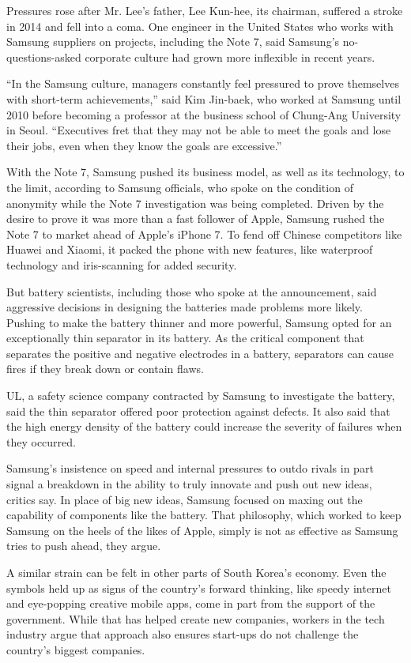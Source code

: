 Pressures rose after Mr. Lee's father, Lee Kun-hee, its chairman,
suffered a stroke in 2014 and fell into a coma. One engineer in the
United States who works with Samsung suppliers on projects, including
the Note 7, said Samsung's no-questions-asked corporate culture had
grown more inflexible in recent years.

``In the Samsung culture, managers constantly feel pressured to prove
themselves with short-term achievements,'' said Kim Jin-baek, who worked
at Samsung until 2010 before becoming a professor at the business school
of Chung-Ang University in Seoul. ``Executives fret that they may not be
able to meet the goals and lose their jobs, even when they know the
goals are excessive.''

With the Note 7, Samsung pushed its business model, as well as its
technology, to the limit, according to Samsung officials, who spoke on
the condition of anonymity while the Note 7 investigation was being
completed. Driven by the desire to prove it was more than a fast
follower of Apple, Samsung rushed the Note 7 to market ahead of Apple's
iPhone 7. To fend off Chinese competitors like Huawei and Xiaomi, it
packed the phone with new features, like waterproof technology and
iris-scanning for added security.

But battery scientists, including those who spoke at the announcement,
said aggressive decisions in designing the batteries made problems more
likely. Pushing to make the battery thinner and more powerful, Samsung
opted for an exceptionally thin separator in its battery. As the
critical component that separates the positive and negative electrodes
in a battery, separators can cause fires if they break down or contain
flaws.

UL, a safety science company contracted by Samsung to investigate the
battery, said the thin separator offered poor protection against
defects. It also said that the high energy density of the battery could
increase the severity of failures when they occurred.

Samsung's insistence on speed and internal pressures to outdo rivals in
part signal a breakdown in the ability to truly innovate and push out
new ideas, critics say. In place of big new ideas, Samsung focused on
maxing out the capability of components like the battery. That
philosophy, which worked to keep Samsung on the heels of the likes of
Apple, simply is not as effective as Samsung tries to push ahead, they
argue.

A similar strain can be felt in other parts of South Korea's economy.
Even the symbols held up as signs of the country's forward thinking,
like speedy internet and eye-popping creative mobile apps, come in part
from the support of the government. While that has helped create new
companies, workers in the tech industry argue that approach also ensures
start-ups do not challenge the country's biggest companies.

